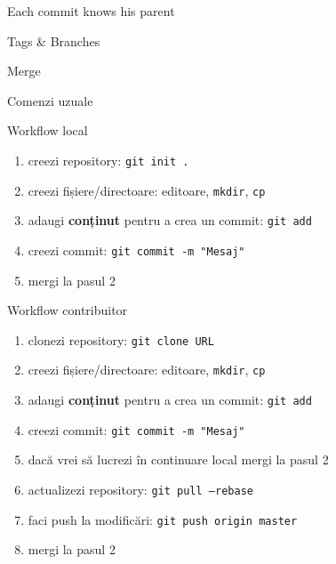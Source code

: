 \documentclass{beamer}
\begin{document}
\begin{frame}{Each commit knows his parent}
  \begin{center}
  \end{center}
\end{frame}

\begin{frame}{Tags \& Branches}
  \begin{center}
  \end{center}
\end{frame}

\begin{frame}{Merge}
  \begin{center}
  \end{center}
\end{frame}

\begin{frame}{Comenzi uzuale}
  \begin{center}
  \end{center}
\end{frame}

\begin{frame}{Workflow local}
  \begin{enumerate}
    \item creezi repository: \texttt{git init .}
    \item creezi fișiere/directoare: editoare, \texttt{mkdir}, \texttt{cp}
    \item adaugi \textbf{conținut} pentru a crea un commit: \texttt{git
      add}
    \item creezi commit: \texttt{git commit -m "Mesaj"}
    \item mergi la pasul 2
  \end{enumerate}
\end{frame}

\begin{frame}{Workflow contribuitor}
  \begin{enumerate}
    \item clonezi repository: \texttt{git clone URL}
    \item creezi fișiere/directoare: editoare, \texttt{mkdir}, \texttt{cp}
    \item adaugi \textbf{conținut} pentru a crea un commit: \texttt{git
      add}
    \item creezi commit: \texttt{git commit -m "Mesaj"}
    \item dacă vrei să lucrezi în continuare local mergi la pasul 2
    \item actualizezi repository: \texttt{git pull --rebase}
    \item faci push la modificări: \texttt{git push origin master}
    \item mergi la pasul 2
  \end{enumerate}
\end{frame}
\end{document}

